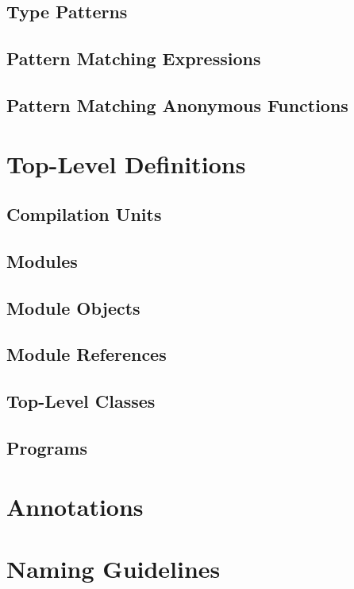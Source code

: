 \section{Type Patterns}

\section{Pattern Matching Expressions}

\section{Pattern Matching Anonymous Functions}

\chapter{Top-Level Definitions}

\section{Compilation Units}

\section{Modules}

\section{Module Objects}

\section{Module References}

\section{Top-Level Classes}

\section{Programs}

\chapter{Annotations}

\chapter{Naming Guidelines}


